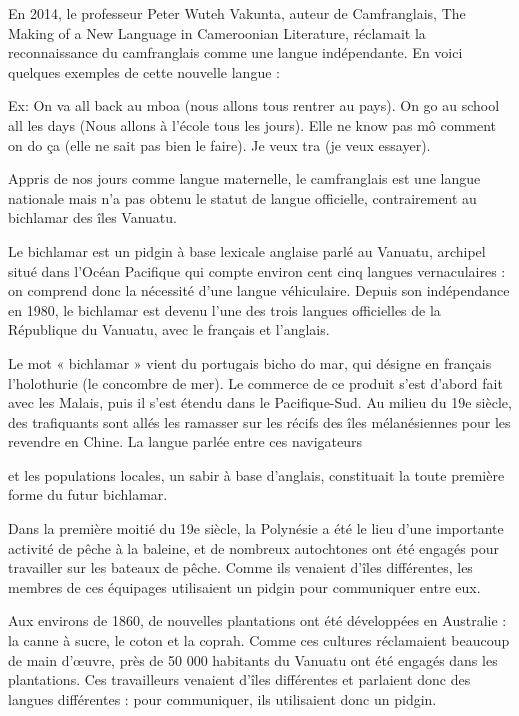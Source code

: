 En 2014, le professeur Peter Wuteh Vakunta, auteur de Camfranglais, The Making of a New Language in Cameroonian Literature, réclamait la reconnaissance du camfranglais comme une langue indépendante. En voici quelques exemples de cette nouvelle langue :


Ex: On va all back au mboa (nous allons tous rentrer au pays). On go au school all les days (Nous allons à l’école tous les jours). Elle ne know pas mô comment on do ça (elle ne sait pas bien le faire). Je veux tra (je veux essayer).


Appris de nos jours comme langue maternelle, le camfranglais est une langue nationale mais n’a pas obtenu le statut de langue officielle, contrairement au bichlamar des îles Vanuatu.




Le bichlamar est un pidgin à base lexicale anglaise parlé au Vanuatu, archipel situé dans l’Océan Pacifique qui compte environ cent cinq langues vernaculaires : on comprend donc la nécessité d’une langue véhiculaire. Depuis son indépendance en 1980, le bichlamar est devenu l’une des trois langues officielles de la République du Vanuatu, avec le français et l’anglais.



Le mot « bichlamar » vient du portugais bicho do mar, qui désigne en français l’holothurie (le concombre de mer). Le commerce de ce produit s’est d’abord fait avec les Malais, puis il s’est étendu dans le Pacifique-Sud. Au milieu du 19e siècle, des trafiquants sont allés les ramasser sur les récifs des îles mélanésiennes pour les revendre en Chine. La langue parlée entre ces navigateurs



et les populations locales, un sabir à base d’anglais, constituait la toute première forme du futur bichlamar.


Dans la première moitié du 19e siècle, la Polynésie a été le lieu d’une importante activité de pêche à la baleine, et de nombreux autochtones ont été engagés pour travailler sur les bateaux de pêche. Comme ils venaient d’îles différentes, les membres de ces équipages utilisaient un pidgin pour communiquer entre eux.


Aux environs de 1860, de nouvelles plantations ont été développées en Australie : la canne à sucre, le coton et la coprah. Comme ces cultures réclamaient beaucoup de main d’œuvre, près de 50 000 habitants du Vanuatu ont été engagés dans les plantations. Ces travailleurs venaient d’îles différentes et parlaient donc des langues différentes : pour communiquer, ils utilisaient donc un pidgin.


